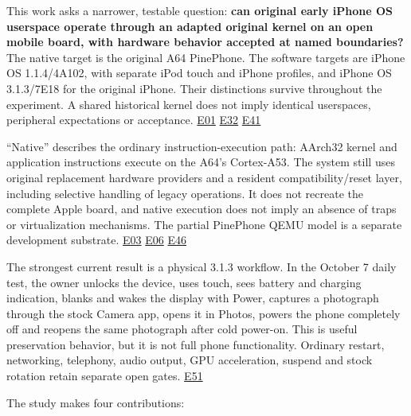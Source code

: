 \documentclass[10pt,letterpaper,twocolumn]{article}
\begin{document}
This work asks a narrower, testable question: \textbf{can original early iPhone OS userspace operate through an adapted original kernel on an open mobile board, with hardware behavior accepted at named boundaries?} The native target is the original A64 PinePhone. The software targets are iPhone OS 1.1.4/4A102, with separate iPod touch and iPhone profiles, and iPhone OS 3.1.3/7E18 for the original iPhone. Their distinctions survive throughout the experiment. A shared historical kernel does not imply identical userspaces, peripheral expectations or acceptance. \hyperlink{e-E01}{\textsf{E01}} \hyperlink{e-E32}{\textsf{E32}} \hyperlink{e-E41}{\textsf{E41}}

``Native'' describes the ordinary instruction-execution path: AArch32 kernel and application instructions execute on the A64's Cortex-A53. The system still uses original replacement hardware providers and a resident compatibility/reset layer, including selective handling of legacy operations. It does not recreate the complete Apple board, and native execution does not imply an absence of traps or virtualization mechanisms. The partial PinePhone QEMU model is a separate development substrate. \hyperlink{e-E03}{\textsf{E03}} \hyperlink{e-E06}{\textsf{E06}} \hyperlink{e-E46}{\textsf{E46}}

The strongest current result is a physical 3.1.3 workflow. In the October 7 daily test, the owner unlocks the device, uses touch, sees battery and charging indication, blanks and wakes the display with Power, captures a photograph through the stock Camera app, opens it in Photos, powers the phone completely off and reopens the same photograph after cold power-on. This is useful preservation behavior, but it is not full phone functionality. Ordinary restart, networking, telephony, audio output, GPU acceleration, suspend and stock rotation retain separate open gates. \hyperlink{e-E51}{\textsf{E51}}

The study makes four contributions:
\end{document}
